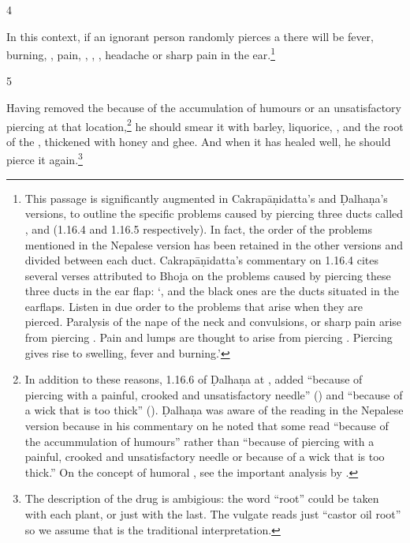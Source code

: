 \begin{translation}
\item [4] 
 
In this context, if an ignorant person randomly pierces a 
there will be fever, burning, , pain, 
,
, 
,
headache or sharp pain in the ear.\footnote{This passage is significantly
    augmented in Cakrapāṇidatta's and Ḍalhaṇa's versions, to outline the specific
    problems caused by piercing three ducts called ,  and
     (1.16.4 \citep[126]{acar-1939} and 1.16.5 \citep[77]{vulgate}
    respectively). In fact, the order of the problems mentioned in the Nepalese
    version has been retained in the other versions and divided between each duct.
    Cakrapāṇidatta's commentary on 1.16.4 \citep[126]{acar-1939} cites several verses
    attributed to Bhoja on the problems caused by piercing these three ducts in the
    ear flap: `,  and the black ones are the ducts
    situated in the earflaps.  Listen in due order to the problems that arise when
    they are pierced. Paralysis of the nape of the neck and convulsions, or sharp pain
    arise from piercing . Pain and lumps are thought to arise from
    piercing . Piercing  gives rise to swelling, fever and
    burning.'}
    
\item[5]     
    
Having removed the  because of the accumulation of
humours or an unsatisfactory piercing at that location,\footnote{In addition to these reasons,
    1.16.6 of Ḍalhaṇa at , added “because of piercing with a painful,
    crooked and unsatisfactory needle” () and 
    “because of a wick that is too thick” (). Ḍalhaṇa was
    aware of the reading in the Nepalese version because in his commentary on
     he noted that some read “because of the accummulation of humours”
    rather than “because of piercing with a painful, crooked and unsatisfactory needle
    or because of a wick that is too thick.” On the concept of humoral
    , see the important analysis by \citet{meul-1992}.} he
    should smear it with barley, liquorice, ,
    and the root of the , thickened with 
    honey and
    ghee. And when it has healed well, he should pierce it again.\footnote{The
        description of the drug is ambigious: the word “root” could be taken with each
        plant, or just with the last.  The vulgate reads just “castor oil root” so we
        assume that is the traditional interpretation.}
    

\end{translation}
